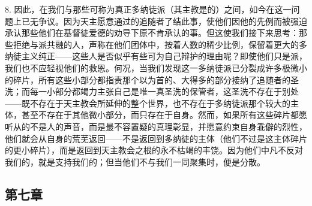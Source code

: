 8. 因此，在我们与那些可称为真正多纳徒派（其主教是的）之间，如今在这一问题上已无争议。因为天主愿意通过的追随者了结此事，使他们因他的先例而被强迫承认那些他们在基督徒爱德的劝导下原不肯承认的事。但这使我们接下来思考：那些拒绝与派共融的人，声称在他们团体中，按着人数的稀少比例，保留着更大的多纳徒主义纯正——这些人是否似乎有些可为自己辩护的理由呢？即使他们只是派，我们也不应轻视他们的救恩。何况，当我们发现这一多纳徒派已分裂成许多极微小的碎片，所有这些小部分都指责那个以为首的、大得多的部分接纳了追随者的圣洗；而每一小部分都竭力主张自己是唯一真圣洗的保管者，这圣洗不存在于别处——既不存在于天主教会所延伸的整个世界，也不存在于多纳徒派那个较大的主体，甚至不存在于其他微小部分，而只存在于自身。然而，如果所有这些碎片都愿听从的不是人的声音，而是最不容置疑的真理彰显，并愿意约束自身乖僻的烈性，他们就会从自身的荒芜返回——不是返回到多纳徒的主体（他们不过是这主体碎片的更小碎片），而是返回到天主教会之根的永不枯竭的丰饶。因为他们中凡不反对我们的，就是支持我们的；但当他们不与我们一同聚集时，便是分散。\par


\subsection{第七章}

